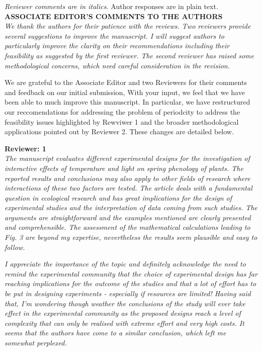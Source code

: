 \documentclass[11pt]{article}
\begin{document}
\emph{Reviewer comments are in italics.} Author responses are in plain text.\\


\textbf{ASSOCIATE EDITOR'S COMMENTS TO THE AUTHORS}\\
\emph{We thank the authors for their patience with the reviews. Two reviewers provide several suggestions to improve the manuscript. I will suggest authors to particularly improve the clarity on their recommendations including their feasibility as suggested by the first reviewer. The second reviewer has raised some methodological concerns, which need careful consideration in the revision.}

We are grateful to the Associate Editor and two Reviewers for their comments and feedback on our initial submission, With your input, we feel that we have been able to much improve this manuscript. In particular, we have restructured our reccomendations for addressing the problem of periodcity to address the feasibility issues highlighted by Rewviwer 1 and the broader methodological applications pointed out by Reviewer 2. These changes are detailed below.

\textbf{Reviewer: 1}\\
\emph{The manuscript evaluates different experimental designs for the investigation of interactive effects of temperature and light on spring phenology of plants. The reported results and conclusions may also apply to other fields of research where interactions of these two factors are tested. The article deals with a fundamental question in ecological research and has great implications for the design of experimental studies and the interpretation of data coming from such studies. The arguments are straightforward and the examples mentioned are clearly presented and comprehensible. The assessment of the mathematical calculations leading to Fig. 3 are beyond my expertise, nevertheless the results seem plausible and easy to follow.}

\emph{I appreciate the importance of the topic and definitely acknowledge the need to remind the experimental community that the choice of experimental design has far reaching implications for the outcome of the studies and that a lot of effort has to be put in designing experiments - especially if resources are limited! Having said that, I’m wondering though weather the conclusions of the study will ever take effect in the experimental community as the proposed designs reach a level of complexity that can only be realised with extreme effort and very high costs. It seems that the authors have come to a similar conclusion, which left me somewhat perplexed.}
\end{document}
